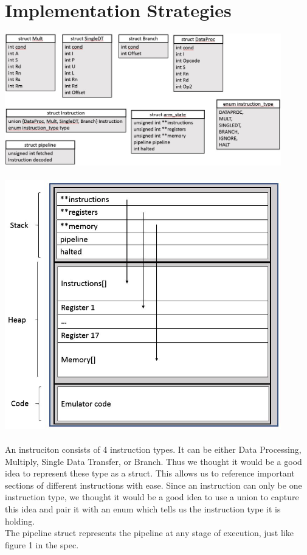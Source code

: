 \documentclass[11pt]{article}
\begin{document}
\section{Implementation Strategies}
\includegraphics[width=12cm]{Capture.JPG}
\\~\\
\includegraphics[width=12cm]{sasd.JPG}
\\~\\
An instruciton consists of 4 instruction types. It can be either Data Processing, Multiply, Single Data Transfer, or Branch.
Thus we thought it would be a good idea to represent these type as a  struct. This allows us to reference important sections
of different instructions with ease. Since an instruction can only be one instruction type, we thought it would be a good idea to
use a union to capture this idea and pair it with an enum which tells us the instruction type it is holding.
\\The pipeline struct represents the pipeline at any stage of execution, just like figure 1 in the spec.
\end{document}
